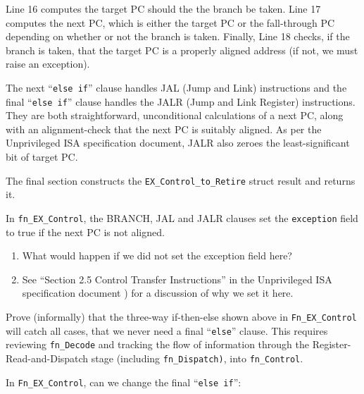 Line 16 computes the target PC should the the branch be taken.  Line
17 computes the next PC, which is either the target PC or the
fall-through PC depending on whether or not the branch is taken.
Finally, Line 18 checks, if the branch is taken, that the target PC is
a properly aligned address (if not, we must raise an exception).

The next ``\verb|else if|'' clause handles JAL (Jump and Link)
instructions and the final ``\verb|else if|'' clause handles the JALR
(Jump and Link Register) instructions.  They are both straightforward,
unconditional calculations of a next PC, along with an alignment-check
that the next PC is suitably aligned.  As per the Unprivileged ISA
specification document, JALR also zeroes the least-significant bit of
target PC.

The final section constructs the \verb|EX_Control_to_Retire| struct
result and returns it.

\vspace*{2ex}

\hdivider

\Exercise

In {\tt fn\_EX\_Control}, the BRANCH, JAL and JALR clauses set the
{\tt exception} field to true if the next PC is not aligned.

\begin{enumerate}

  \item What would happen if we did not set the exception field here?

  \item See ``Section 2.5 Control Transfer Instructions'' in the
      Unprivileged ISA specification document
      \cite{RISCV_Unpriv_2019_12_13}) for a discussion of why we set
      it here.

\end{enumerate}

\Exercise

Prove (informally) that the three-way if-then-else shown above in
\verb|Fn_EX_Control| will catch all cases, {\ie} that we never need a
final ``\verb|else|'' clause.  This requires reviewing
\verb|fn_Decode| and tracking the flow of information through the
Register-Read-and-Dispatch stage (including \verb|fn_Dispatch)|, into
\verb|fn_Control|.

\Exercise

In \verb|Fn_EX_Control|, can we change the final ``\verb|else if|'':

